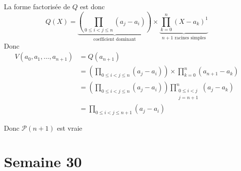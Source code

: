 \documentclass{article}
\renewenvironment{question_kholle}[2][ ]
{
	\subsection{\texorpdfstring{#2}{}}
	\notblank{#1}
	{
		\noindent #1
		\bigbreak
	}
	{}
	\begin{proof}
}
{
	\end{proof}
}
\begin{document}
\begin{question_kholle}
\begin{itemize}[label=$\lozenge$]
\begin{itemize}
                  La forme factorisée de $Q$ est donc
                  $$
                    Q(X)=\underbrace{ \left( \prod_{0\leqslant i < j \leqslant n} (a_{j}-a_{i})\right) }_{ \text{coefficient dominant} } \times \underbrace{ \prod_{k=0}^{n}(X-a_{k})^{1} }_{ n+1 \text{ racines simples} }
                  $$
                  Donc
                  \begin{align*}
                    V(a_{0}, a_{1},\dots, a_{n+1}) & =Q(a_{n+1})                                                                                                \\
                                                   & =  \left( \prod_{0\leqslant i < j \leqslant n} (a_{j}-a_{i})\right) \times  \prod_{k=0}^{n}(a_{n+1}-a_{k}) \\
                                                   & = \left( \prod_{0\leqslant i < j \leqslant n} (a_{j}-a_{i})\right) \prod_{\substack{0\leqslant i<j         \\ j=n+1}}^{n}(a_{j}-a_{k}) \\
                                                   & = \prod_{0\leqslant i < j \leqslant n+1} (a_{j}-a_{i})
                  \end{align*}

                  Donc $\mathcal{P}(n+1)$ est vraie
          \end{itemize}
  \end{itemize}
\end{question_kholle}
\pagebreak\section{Semaine 30}
\end{document}
